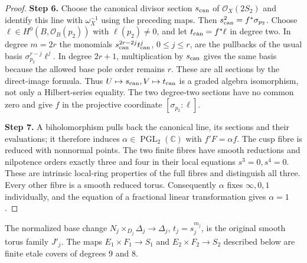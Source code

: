 \begin{proof}
\par\smallskip\noindent\textbf{Step 6.} Choose the canonical divisor section $s_{\rm can}$ of $\mathcal O_X(2S_2)$ and identify this line with $\omega_X^{-1}$ using the preceding maps. Then $s_{\rm can}^2=f^*\sigma_{p_2}$. Choose $\ell\in H^0(B,\mathcal O_B(p_2))$ with $\ell(p_2)\ne0$, and let $t_{\rm can}=f^*\ell$ in degree two. In degree $m=2r$ the monomials $s_{\rm can}^{2r-2j}t_{\rm can}^j$, $0\le j\le r$, are the pullbacks of the usual basis $\sigma_{p_2}^{r-j}\ell^j$. In degree $2r+1$, multiplication by $s_{\rm can}$ gives the same basis because the allowed base pole order remains $r$. These are all sections by the direct-image formula. Thus $U\mapsto s_{\rm can},V\mapsto t_{\rm can}$ is a graded algebra isomorphism, not only a Hilbert-series equality. The two degree-two sections have no common zero and give $f$ in the projective coordinate $[\sigma_{p_2}:\ell]$.

\par\smallskip\noindent\textbf{Step 7.} A biholomorphism pulls back the canonical line, its sections and their evaluations; it therefore induces $\alpha\in\operatorname{PGL}_2(\mathbb C)$ with $f'F=\alpha f$. The cusp fibre is reduced with nonnormal points. The two finite fibres have smooth reductions and nilpotence orders exactly three and four in their local equations $s^3=0,s^4=0$. These are intrinsic local-ring properties of the full fibres and distinguish all three. Every other fibre is a smooth reduced torus. Consequently $\alpha$ fixes $\infty,0,1$ individually, and the equation of a fractional linear transformation gives $\alpha=1$.
\end{proof}
\begin{proposition}[FAM A.1.2; T]\label{fam:A.1.2}
The normalized base change $N_j\times_{D_j}\Delta_j\to\Delta_j$, $t_j=s_j^{m_j}$, is the original smooth torus family $J'_j$. The maps $E_1\times F_1\to S_1$ and $E_2\times F_2\to S_2$ described below are finite etale covers of degrees $9$ and $8$.
\end{proposition}
